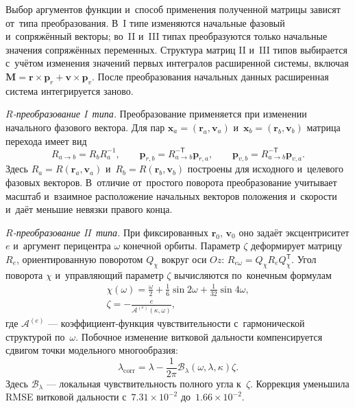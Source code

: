 Выбор аргументов функции и~способ применения полученной матрицы зависят от~типа преобразования. В~I типе изменяются начальные фазовый и~сопряжённый векторы; во~II и~III типах преобразуются только начальные значения сопряжённых переменных. Структура матриц II и~III типов выбирается с~учётом изменения значений первых интегралов расширенной системы, включая $\mathbf M=\mathbf r\times\mathbf p_r+\mathbf v\times\mathbf p_v$. После преобразования начальных данных расширенная система интегрируется заново.

\noindent\textit{$R$-преобразование I~типа.} Преобразование применяется при изменении начального фазового вектора. Для пар $\mathbf x_a=(\mathbf r_a,\mathbf v_a)$ и~$\mathbf x_b=(\mathbf r_b,\mathbf v_b)$ матрица перехода имеет вид
\begin{equation}
    R_{a\to b}=R_bR_a^{-1},
    \qquad
    \mathbf p_{r,b}=R_{a\to b}^{-\mathsf T}\mathbf p_{r,a},
    \qquad
    \mathbf p_{v,b}=R_{a\to b}^{-\mathsf T}\mathbf p_{v,a}.
    \label{eq:syn-r-type1}
\end{equation}
Здесь $R_a=R(\mathbf r_a,\mathbf v_a)$ и~$R_b=R(\mathbf r_b,\mathbf v_b)$ построены для исходного и~целевого фазовых векторов. В~отличие от~простого поворота преобразование учитывает масштаб и~взаимное расположение начальных векторов положения и~скорости и~даёт меньшие невязки правого конца.

\noindent\textit{$R$-преобразование II~типа.} При фиксированных $\mathbf r_0$, $\mathbf v_0$ оно задаёт эксцентриситет $e$ и~аргумент перицентра $\omega$ конечной орбиты. Параметр $\zeta$ деформирует матрицу $R_e$, ориентированную поворотом $Q_\chi$ вокруг оси $Oz$: $R_{e\omega}=Q_\chi R_eQ_\chi^{\mathsf T}$.
Угол поворота $\chi$ и~управляющий параметр $\zeta$ вычисляются по~конечным формулам
\begin{equation}
\begin{gathered}
    \chi(\omega)=\frac{\omega}{2}+\frac16\sin2\omega+\frac1{32}\sin4\omega,\\
    \zeta=-\frac{e}{\mathcal A^{(e)}(\kappa,\omega)},
\end{gathered}
\label{eq:syn-r-type2-control}
\end{equation}
где $\mathcal A^{(e)}$ --- коэффициент-функция чувствительности с~гармонической структурой по~$\omega$. Побочное изменение витковой дальности компенсируется сдвигом точки модельного многообразия:
\begin{equation}
    \lambda_{\mathrm{corr}}=
    \lambda-\frac{1}{2\pi}\mathcal B_\lambda(\omega,\lambda,\kappa)\zeta.
    \label{eq:syn-lambda-correction}
\end{equation}
Здесь $\mathcal B_\lambda$ --- локальная чувствительность полного угла к~$\zeta$. Коррекция уменьшила RMSE витковой дальности с~$7.31\times10^{-2}$ до~$1.66\times10^{-2}$.

